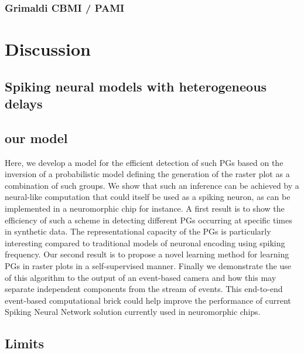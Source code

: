 \documentclass[brainsci, %
               review,submit,pdftex,moreauthors%
               ]{Definitions/mdpi}
\begin{document}
\subsubsection{Grimaldi CBMI / PAMI}\label{grimaldi-cbmi-pami}
\section{Discussion}\label{discussion}
\subsection{Spiking neural models with heterogeneous delays}
\subsection{our model}\label{our-model}
Here, we develop a model for the efficient detection of such PGs based on the inversion of a probabilistic model defining the generation of the raster plot as a combination of such groups. We show that such an inference can be achieved by a neural-like computation that could itself be used as a spiking neuron, as can be implemented in a neuromorphic chip for instance. A first result is to show the efficiency of such a scheme in detecting different PGs occurring at specific times in synthetic data. The representational capacity of the PGs is particularly interesting compared to traditional models of neuronal encoding using spiking frequency. Our second result is to propose a novel learning method for learning PGs in raster plots in a self-supervised manner. Finally we demonstrate the use of this algorithm to the output of an event-based camera and how this may separate independent components from the stream of events. This end-to-end event-based computational brick could help improve the performance of current Spiking Neural Network solution currently used in neuromorphic chips.


\subsection{Limits}
\end{document}
